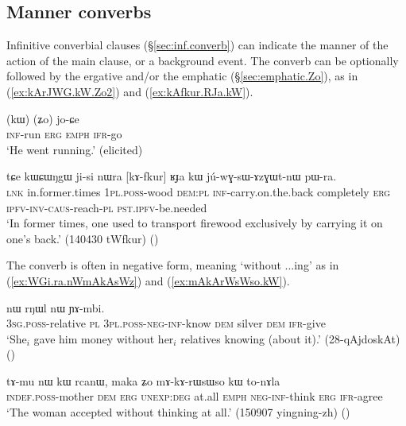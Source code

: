 \subsection{Manner converbs} \label{sec:manner.converbs}
Infinitive converbial clauses (§\ref{sec:inf.converb}) can indicate the manner of the action of the main clause, or a background event. The converb can be optionally followed by the ergative  and/or the emphatic  (§\ref{sec:emphatic.Zo}), as in (\ref{ex:kArJWG.kW.Zo2}) and (\ref{ex:kAfkur.RJa.kW}).

\begin{exe}
\ex \label{ex:kArJWG.kW.Zo2}
\gll [kɤ-rɟɯɣ] (kɯ) (ʑo) jo-ɕe \\
\textsc{inf}-run \textsc{erg} \textsc{emph} \textsc{ifr}-go \\
\glt `He went running.' (elicited)
\end{exe}

\begin{exe}
\ex \label{ex:kAfkur.RJa.kW}
\gll tɕe kɯɕɯŋgɯ ji-si nɯra [kɤ-fkur] ʁɟa kɯ jú-wɣ-sɯ-ɤzɣɯt-nɯ pɯ-ra. \\
\textsc{lnk} in.former.times \textsc{1pl}.\textsc{poss}-wood \textsc{dem}:\textsc{pl} \textsc{inf}-carry.on.the.back completely \textsc{erg} \textsc{ipfv}-\textsc{inv}-\textsc{caus}-reach-\textsc{pl} \textsc{pst}.\textsc{ipfv}-be.needed \\
\glt `In former times, one used to transport firewood exclusively by carrying it on one's back.' (140430 tWfkur)
()
\end{exe}


The converb is often in negative form, meaning `without ...ing' as in  (\ref{ex:WGi.ra.nWmAkAsWz}) and (\ref{ex:mAkArWsWso.kW}).

\begin{exe}
\ex \label{ex:WGi.ra.nWmAkAsWz}
\gll  [ɯ-ɣi ra nɯ-mɤ-kɤ-sɯz] nɯ rŋɯl nɯ ɲɤ-mbi. \\
\textsc{3sg}.\textsc{poss}-relative \textsc{pl} \textsc{3pl}.\textsc{poss}-\textsc{neg}-\textsc{inf}-know \textsc{dem} silver \textsc{dem} \textsc{ifr}-give \\
\glt `She$_i$ gave him money without her$_i$ relatives knowing (about it).' (28-qAjdoskAt)
()
\end{exe}


\begin{exe}
\ex \label{ex:mAkArWsWso.kW}
\gll  tɤ-mu nɯ kɯ rcanɯ, maka ʑo mɤ-kɤ-rɯsɯso kɯ to-nɤla \\
\textsc{indef}.\textsc{poss}-mother \textsc{dem} \textsc{erg} \textsc{unexp}:\textsc{deg} at.all \textsc{emph} \textsc{neg}-\textsc{inf}-think \textsc{erg} \textsc{ifr}-agree \\
\glt `The woman accepted without thinking at all.' (150907 yingning-zh)
()
\end{exe}

